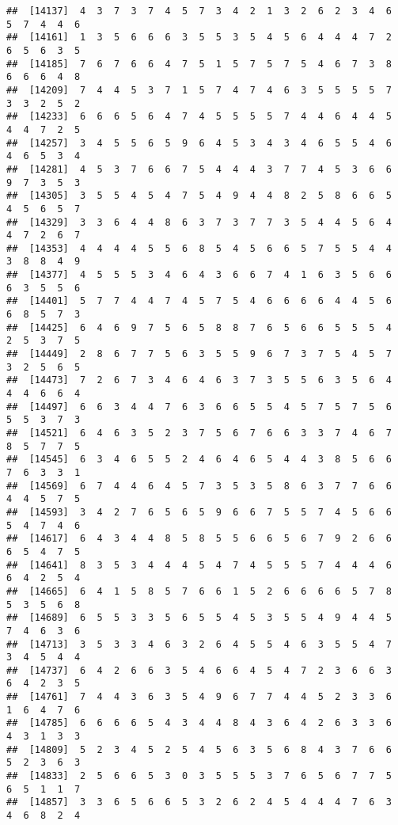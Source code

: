 \documentclass[
]{book}
\begin{document}
\begin{verbatim}
##  [14137]  4  3  7  3  7  4  5  7  3  4  2  1  3  2  6  2  3  4  6  5  7  4  4  6
##  [14161]  1  3  5  6  6  6  3  5  5  3  5  4  5  6  4  4  4  7  2  6  5  6  3  5
##  [14185]  7  6  7  6  6  4  7  5  1  5  7  5  7  5  4  6  7  3  8  6  6  6  4  8
##  [14209]  7  4  4  5  3  7  1  5  7  4  7  4  6  3  5  5  5  5  7  3  3  2  5  2
##  [14233]  6  6  6  5  6  4  7  4  5  5  5  5  7  4  4  6  4  4  5  4  4  7  2  5
##  [14257]  3  4  5  5  6  5  9  6  4  5  3  4  3  4  6  5  5  4  6  4  6  5  3  4
##  [14281]  4  5  3  7  6  6  7  5  4  4  4  3  7  7  4  5  3  6  6  9  7  3  5  3
##  [14305]  3  5  5  4  5  4  7  5  4  9  4  4  8  2  5  8  6  6  5  4  5  6  5  7
##  [14329]  3  3  6  4  4  8  6  3  7  3  7  7  3  5  4  4  5  6  4  4  7  2  6  7
##  [14353]  4  4  4  4  5  5  6  8  5  4  5  6  6  5  7  5  5  4  4  3  8  8  4  9
##  [14377]  4  5  5  5  3  4  6  4  3  6  6  7  4  1  6  3  5  6  6  6  3  5  5  6
##  [14401]  5  7  7  4  4  7  4  5  7  5  4  6  6  6  6  4  4  5  6  6  8  5  7  3
##  [14425]  6  4  6  9  7  5  6  5  8  8  7  6  5  6  6  5  5  5  4  2  5  3  7  5
##  [14449]  2  8  6  7  7  5  6  3  5  5  9  6  7  3  7  5  4  5  7  3  2  5  6  5
##  [14473]  7  2  6  7  3  4  6  4  6  3  7  3  5  5  6  3  5  6  4  4  4  6  6  4
##  [14497]  6  6  3  4  4  7  6  3  6  6  5  5  4  5  7  5  7  5  6  5  5  3  7  3
##  [14521]  6  4  6  3  5  2  3  7  5  6  7  6  6  3  3  7  4  6  7  8  5  7  7  5
##  [14545]  6  3  4  6  5  5  2  4  6  4  6  5  4  4  3  8  5  6  6  7  6  3  3  1
##  [14569]  6  7  4  4  6  4  5  7  3  5  3  5  8  6  3  7  7  6  6  4  4  5  7  5
##  [14593]  3  4  2  7  6  5  6  5  9  6  6  7  5  5  7  4  5  6  6  5  4  7  4  6
##  [14617]  6  4  3  4  4  8  5  8  5  5  6  6  5  6  7  9  2  6  6  6  5  4  7  5
##  [14641]  8  3  5  3  4  4  4  5  4  7  4  5  5  5  7  4  4  4  6  6  4  2  5  4
##  [14665]  6  4  1  5  8  5  7  6  6  1  5  2  6  6  6  6  5  7  8  5  3  5  6  8
##  [14689]  6  5  5  3  3  5  6  5  5  4  5  3  5  5  4  9  4  4  5  7  4  6  3  6
##  [14713]  3  5  3  3  4  6  3  2  6  4  5  5  4  6  3  5  5  4  7  3  4  5  4  4
##  [14737]  6  4  2  6  6  3  5  4  6  6  4  5  4  7  2  3  6  6  3  6  4  2  3  5
##  [14761]  7  4  4  3  6  3  5  4  9  6  7  7  4  4  5  2  3  3  6  1  6  4  7  6
##  [14785]  6  6  6  6  5  4  3  4  4  8  4  3  6  4  2  6  3  3  6  4  3  1  3  3
##  [14809]  5  2  3  4  5  2  5  4  5  6  3  5  6  8  4  3  7  6  6  5  2  3  6  3
##  [14833]  2  5  6  6  5  3  0  3  5  5  5  3  7  6  5  6  7  7  5  6  5  1  1  7
##  [14857]  3  3  6  5  6  6  5  3  2  6  2  4  5  4  4  4  7  6  3  4  6  8  2  4

\end{verbatim}
\end{document}
